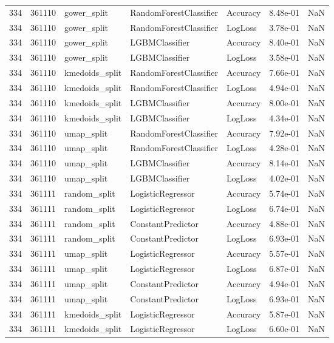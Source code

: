 \begin{tabular}{rrlllrr}
334 & 361110 & gower\_split & RandomForestClassifier & Accuracy & 8.48e-01 & NaN \\
334 & 361110 & gower\_split & RandomForestClassifier & LogLoss & 3.78e-01 & NaN \\
334 & 361110 & gower\_split & LGBMClassifier & Accuracy & 8.40e-01 & NaN \\
334 & 361110 & gower\_split & LGBMClassifier & LogLoss & 3.58e-01 & NaN \\
334 & 361110 & kmedoids\_split & RandomForestClassifier & Accuracy & 7.66e-01 & NaN \\
334 & 361110 & kmedoids\_split & RandomForestClassifier & LogLoss & 4.94e-01 & NaN \\
334 & 361110 & kmedoids\_split & LGBMClassifier & Accuracy & 8.00e-01 & NaN \\
334 & 361110 & kmedoids\_split & LGBMClassifier & LogLoss & 4.34e-01 & NaN \\
334 & 361110 & umap\_split & RandomForestClassifier & Accuracy & 7.92e-01 & NaN \\
334 & 361110 & umap\_split & RandomForestClassifier & LogLoss & 4.28e-01 & NaN \\
334 & 361110 & umap\_split & LGBMClassifier & Accuracy & 8.14e-01 & NaN \\
334 & 361110 & umap\_split & LGBMClassifier & LogLoss & 4.02e-01 & NaN \\
334 & 361111 & random\_split & LogisticRegressor & Accuracy & 5.74e-01 & NaN \\
334 & 361111 & random\_split & LogisticRegressor & LogLoss & 6.74e-01 & NaN \\
334 & 361111 & random\_split & ConstantPredictor & Accuracy & 4.88e-01 & NaN \\
334 & 361111 & random\_split & ConstantPredictor & LogLoss & 6.93e-01 & NaN \\
334 & 361111 & umap\_split & LogisticRegressor & Accuracy & 5.57e-01 & NaN \\
334 & 361111 & umap\_split & LogisticRegressor & LogLoss & 6.87e-01 & NaN \\
334 & 361111 & umap\_split & ConstantPredictor & Accuracy & 4.94e-01 & NaN \\
334 & 361111 & umap\_split & ConstantPredictor & LogLoss & 6.93e-01 & NaN \\
334 & 361111 & kmedoids\_split & LogisticRegressor & Accuracy & 5.87e-01 & NaN \\
334 & 361111 & kmedoids\_split & LogisticRegressor & LogLoss & 6.60e-01 & NaN \\

\end{tabular}
